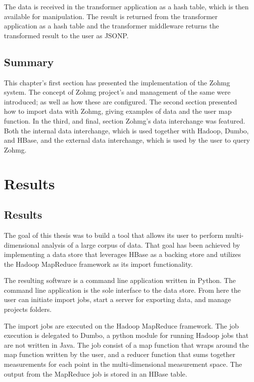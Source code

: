 The data is received in the transformer application as a hash table, which is
then available for manipulation. The result is returned from the transformer
application as a hash table and the transformer middleware returns the
transformed result to the user as JSONP.



\section*{Summary}

This chapter's first section has presented the implementation of the Zohmg
system. The concept of Zohmg project's and management of the same were
introduced; as well as how these are configured. The second section presented
how to import data with Zohmg, giving examples of data and the user map
function. In the third, and final, section Zohmg's data interchange was
featured. Both the internal data interchange, which is used together with
Hadoop, Dumbo, and HBase, and the external data interchange, which is used by
the user to query Zohmg.



\chapter{Results}


\section{Results}

The goal of this thesis was to build a tool that allows its user to perform
multi-dimensional analysis of a large corpus of data. That goal has been
achieved by implementing a data store that leverages HBase as a backing store
and utilizes the Hadoop MapReduce framework as its import functionality.

The resulting software is a command line application written in Python. The
command line application is the sole interface to the data store. From here the
user can initiate import jobs, start a server for exporting data, and manage
projects folders.

The import jobs are executed on the Hadoop MapReduce framework. The job
execution is delegated to Dumbo, a python module for running Hadoop jobs that
are not written in Java. The job consist of a map function that wraps around the
map function written by the user, and a reducer function that sums together
measurements for each point in the multi-dimensional measurement space. The
output from the MapReduce job is stored in an HBase table.


